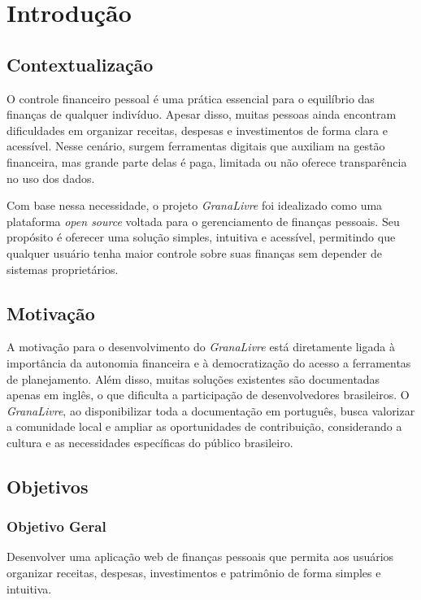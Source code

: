 \chapter{Introdução}\label{cap:intro}

\section{Contextualização}
O controle financeiro pessoal é uma prática essencial para o equilíbrio das finanças de qualquer indivíduo. Apesar disso, muitas pessoas ainda encontram dificuldades em organizar receitas, despesas e investimentos de forma clara e acessível. Nesse cenário, surgem ferramentas digitais que auxiliam na gestão financeira, mas grande parte delas é paga, limitada ou não oferece transparência no uso dos dados.

Com base nessa necessidade, o projeto \textit{GranaLivre} foi idealizado como uma plataforma \textit{open source} voltada para o gerenciamento de finanças pessoais. Seu propósito é oferecer uma solução simples, intuitiva e acessível, permitindo que qualquer usuário tenha maior controle sobre suas finanças sem depender de sistemas proprietários.

\section{Motivação}
A motivação para o desenvolvimento do \textit{GranaLivre} está diretamente ligada à importância da autonomia financeira e à democratização do acesso a ferramentas de planejamento. Além disso, muitas soluções existentes são documentadas apenas em inglês, o que dificulta a participação de desenvolvedores brasileiros. O \textit{GranaLivre}, ao disponibilizar toda a documentação em português, busca valorizar a comunidade local e ampliar as oportunidades de contribuição, considerando a cultura e as necessidades específicas do público brasileiro.

\section{Objetivos}

\subsection{Objetivo Geral}
Desenvolver uma aplicação web de finanças pessoais que permita aos usuários organizar receitas, despesas, investimentos e patrimônio de forma simples e intuitiva.

